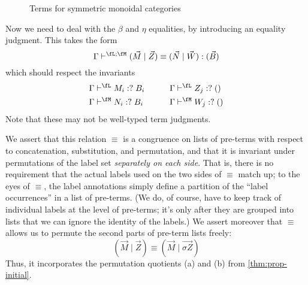 \documentclass{book}
\let\types\vdash
\newcommand{\pc}{\mathrel{\mathord{:}?}}
\def\one{\mathbf{1}}
\def\ott{\mathord{\star}}%
\let\tensor\otimes
\def\tensorI{\mathord{\tensor}I}
\def\tensorE{\mathord{\tensor}E}
\def\tpair#1#2{\text{\textlquill} #1,#2 \text{\textrquill}}%
\begin{document}
\begin{figure}
  \centering
  \caption{Terms for symmetric monoidal categories}
  \label{fig:prop-smc-terms}
\end{figure}

Now we need to deal with the $\beta$ and $\eta$ equalities, by introducing an equality judgment.
This takes the form
\[\Gamma \types^{\fL;\fM} (\vec M\mid\vec Z)\equiv (\vec N\mid\vec W) :(\vec B)\]
which should respect the invariants
\begin{alignat*}{2}
  \Gamma&\types^{\fL} M_i\pc B_i &\qquad
  \Gamma&\types^{\fL} Z_j\pc ()\\
  \Gamma&\types^{\fM} N_i\pc B_i &\qquad
  \Gamma&\types^{\fM} W_j\pc ()
\end{alignat*}
Note that these may not be well-typed term judgments.

We assert that this relation $\equiv$ is a congruence on lists of pre-terms with respect to concatenation, substitution, and permutation, and that it is invariant under permutations of the label set \fA \emph{separately on each side}.
That is, there is no requirement that the actual labels used on the two sides of $\equiv$ match up; to the eyes of $\equiv$, the label annotations simply define a partition of the ``label occurrences'' in a list of pre-terms.
(We do, of course, have to keep track of individual labels at the level of pre-terms; it's only after they are grouped into lists that we can ignore the identity of the labels.)
We assert moreover that $\equiv$ allows us to permute the second parts of pre-term lists freely:
\[ (\vec M \mid \vec{Z}) \equiv (\vec M \mid \vec{\sigma Z})\]
Thus, it incorporates the permutation quotients (a) and (b) from \cref{thm:prop-initial}.
\end{document}
